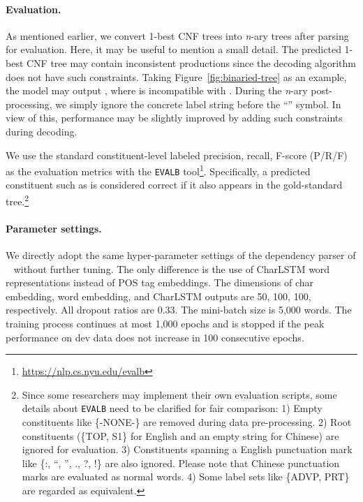 \documentclass{article}
\begin{document}
\begin{table}[tb]
\paragraph{Evaluation.}
As mentioned earlier, we convert 1-best CNF trees into \textit{n}-ary trees after parsing for evaluation.
Here, it may be useful to mention a small detail.
The predicted 1-best CNF tree may contain inconsistent productions since the decoding algorithm does not have such constraints.
Taking Figure~\ref{fig:binaried-tree} as an example, the model may output , where  is incompatible with .
During the \textit{n}-ary post-processing, we simply ignore the concrete label string  before the ``'' symbol.
In view of this, performance may be slightly improved by adding such constraints during decoding.

We use the standard constituent-level labeled precision, recall, F-score (P/R/F) as the evaluation metrics with the \texttt{EVALB} tool\footnote{\url{https://nlp.cs.nyu.edu/evalb}}.
Specifically, a predicted constituent such as  is considered correct if it also appears in the gold-standard tree.\footnote{
Since some researchers may implement their own evaluation scripts, some details about \texttt{EVALB} need to be clarified for fair comparison:
1) Empty constituents like \{-NONE-\} are removed during data pre-processing.
2) Root constituents (\{TOP, S1\} for English and an empty string for Chinese) are ignored for evaluation.
3) Constituents spanning a English punctuation mark like \{:, ``, '', ., ?, !\} are also ignored. Please note that Chinese punctuation marks are evaluated as normal words.
4) Some label sets like \{ADVP, PRT\} are regarded as equivalent.}




\paragraph{Parameter settings.}
We directly adopt the same hyper-parameter settings of the dependency parser of \citeauthor{Timothy-d17-biaffine}~ without further tuning.
The only difference is the use of CharLSTM word representations instead of POS tag embeddings.
The dimensions of char embedding, word embedding, and CharLSTM outputs are
50, 100, 100, respectively.
All dropout ratios are 0.33.
The mini-batch size is 5,000 words.
The training process continues at most 1,000 epochs and is stopped if the peak performance on dev data does not increase in 100 consecutive epochs.









\end{table}
\end{document}
